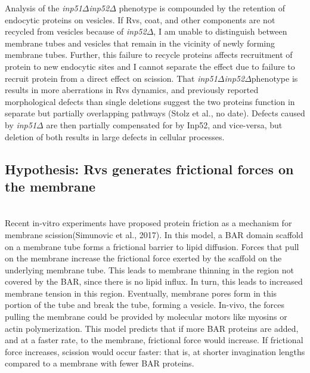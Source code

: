 	\vspace{5mm}

				Analysis of the \textit{inp51$\Delta$}\textit{inp52$\Delta$} phenotype is compounded by the retention of endocytic proteins on vesicles. If Rvs, coat, and other components are not recycled from vesicles because of \textit{inp52$\Delta$}, I am unable to distinguish between membrane tubes and vesicles that remain in the vicinity of newly forming membrane tubes. Further, this failure to recycle proteins affects recruitment of protein to new endocytic sites and I cannot separate the effect due to failure to recruit protein from a direct effect on scission. That \textit{inp51$\Delta$}\textit{inp52$\Delta$}phenotype is results in more aberrations in Rvs dynamics, and previously reported morphological defects than single deletions suggest the two proteins function in separate but partially overlapping pathways (Stolz et al., no date). Defects caused by \textit{inp51$\Delta$}
 are then partially compensated for by Inp52, and vice-versa, but deletion of both results in large defects in cellular processes.




\newpage

\subsection{Hypothesis: Rvs generates frictional forces on the membrane}
				\mbox{}\\
Recent in-vitro experiments have proposed protein friction as a mechanism for membrane scission(Simunovic et al., 2017). In this model, a BAR domain scaffold on a membrane tube forms a frictional barrier to lipid diffusion. Forces that pull on the membrane increase the frictional force exerted by the scaffold on the underlying membrane tube. This leads to membrane thinning in the region not covered by the BAR, since there is no lipid influx. In turn, this leads to increased membrane tension in this region. Eventually, membrane pores form in this portion of the tube and break the tube, forming a vesicle. In-vivo, the forces pulling the membrane could be provided by molecular motors like myosins or actin polymerization.
This model predicts that if more BAR proteins are added, and at a faster rate, to the membrane, frictional force would increase. If frictional force increases, scission would occur faster: that is, at shorter invagination lengths compared to a membrane with fewer BAR proteins. 


